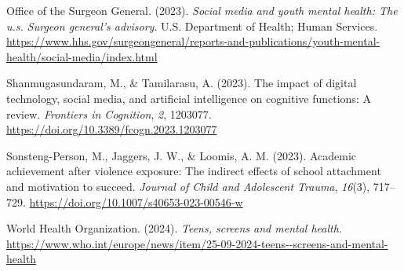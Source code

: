 \documentclass[
  titlepage]{article}
\newlength{\cslhangindent}
\newenvironment{CSLReferences}[2] %
 {\begin{list}{}{%
  \setlength{\itemindent}{0pt}
  \setlength{\leftmargin}{0pt}
  \setlength{\parsep}{0pt}
  \ifodd #1
   \setlength{\leftmargin}{\cslhangindent}
   \setlength{\itemindent}{-1\cslhangindent}
  \fi
  \setlength{\itemsep}{#2\baselineskip}}}
 {\end{list}}
\begin{document}
\begin{CSLReferences}{1}{0}
Office of the Surgeon General. (2023). \emph{Social media and youth
mental health: The u.s. Surgeon general's advisory}. U.S. Department of
Health; Human Services.
\url{https://www.hhs.gov/surgeongeneral/reports-and-publications/youth-mental-health/social-media/index.html}

Shanmugasundaram, M., \& Tamilarasu, A. (2023). The impact of digital
technology, social media, and artificial intelligence on cognitive
functions: A review. \emph{Frontiers in Cognition}, \emph{2}, 1203077.
\url{https://doi.org/10.3389/fcogn.2023.1203077}

Sonsteng-Person, M., Jaggers, J. W., \& Loomis, A. M. (2023). Academic
achievement after violence exposure: The indirect effects of school
attachment and motivation to succeed. \emph{Journal of Child and
Adolescent Trauma}, \emph{16}(3), 717--729.
\url{https://doi.org/10.1007/s40653-023-00546-w}

World Health Organization. (2024). \emph{Teens, screens and mental
health}.
\url{https://www.who.int/europe/news/item/25-09-2024-teens--screens-and-mental-health}

\end{CSLReferences}
\end{document}
